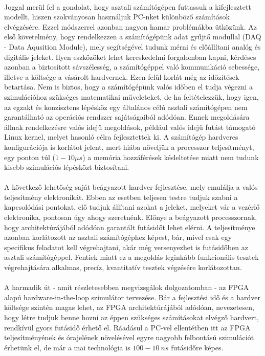 \paragraph{}
Joggal merül fel a gondolat, hogy asztali számítógépen futtassuk a kifejlesztett modellt, hiszen szokványosan használjuk PC-nket különböző számítások elvégzésére. Ezzel módszerrel azonban nagyon hamar problémákba ütközünk. Az első követelmény, hogy rendelkezzen a számítógépünk adat gyűjtő modullal (DAQ - Data Aqusition Module), mely segítségével tudunk mérni és előállítani analóg és digitális jeleket. Ilyen eszközöket lehet kereskedelmi forgalomban kapni, kérdéses azonban a biztosított sávszélesség, a számítógéppel való kommunikáció sebessége, illetve a költsége a vásárolt hardvernek. Ezen felül korlát még az időzítések betartása. Nem is biztos, hogy a számítógépünk valós időben el tudja végezni a szimulációhoz szükséges matematikai műveleteket, de ha feltételezzük, hogy igen, az egzakt és konzisztens lépésköz egy általános célú asztali számítógépen nem garantálható az operációs rendszer sajátságaiból adódóan. Ennek megoldására állnak rendelkezésre valós idejű megoldások, például valós idejű futást támogató Linux kernel, melyet hasonló célra fejlesztettek ki. A számítógép hardveres konfigurációja is korlátot jelent, mert hiába növeljük a processzor teljesítményt, egy ponton túl ($1 - 10 \mu{}s$) a memória hozzáférések késleltetése miatt nem tudunk kisebb szimulációs lépésközt biztosítani.

\paragraph{}
A következő lehetőség saját beágyazott hardver fejlesztése, mely emulálja a valós teljesítmény elektronikát. Ebben az esetben teljesen testre tudjuk szabni a kapcsolódási pontokat, elő tudjuk állítani azokat a jeleket, melyeket vár a vezérlő elektronika, pontosan úgy ahogy szeretnénk. Előnye a beágyazott processzornak, hogy architektúrájából adódóan garantált futásidőt lehet elérni. A teljesítménye azonban korlátozott az asztali számítógéphez képest, bár, mivel csak egy specifikus feladatot kell végrehajtani, akár még versenyezhet is futásidőben az asztali számítógéppel. Fentiek miatt ez a megoldás leginkább funkcionális tesztek végrehajtására alkalmas, precíz, kvantitatív tesztek végzésére korlátozottan.

\paragraph{}
A harmadik út - amit részletesebben megvizsgálok dolgozatomban - az FPGA alapú hardware-in-the-loop szimulátor tervezése. Bár a fejlesztési idő és a hardver költsége szintén magas lehet, az FPGA architektúrájából adódóan, nevezetesen, hogy létre tudjuk benne hozni az éppen szükséges számításokat elvégző hardvert, rendkívül gyors futásidő érhető el. Ráadásul a PC-vel ellentétben itt az FPGA teljesítményének és órajelének növelésével egyre nagyobb felbontású szimulációt érhetünk el, de már a mai technológia is $100 - 10 \ ns$ futásidőre képes.

